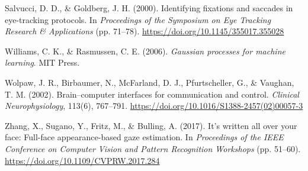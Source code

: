 \documentclass[twocolumn,10pt]{article}
\begin{document}
\begin{description}
    \item Salvucci, D. D., \& Goldberg, J. H. (2000). Identifying fixations and saccades in eye-tracking protocols. In \textit{Proceedings of the Symposium on Eye Tracking Research \& Applications} (pp. 71--78). \url{https://doi.org/10.1145/355017.355028}
    \item Williams, C. K., \& Rasmussen, C. E. (2006). \textit{Gaussian processes for machine learning}. MIT Press.
    \item Wolpaw, J. R., Birbaumer, N., McFarland, D. J., Pfurtscheller, G., \& Vaughan, T. M. (2002). Brain--computer interfaces for communication and control. \textit{Clinical Neurophysiology}, 113(6), 767--791. \url{https://doi.org/10.1016/S1388-2457(02)00057-3}
    \item Zhang, X., Sugano, Y., Fritz, M., \& Bulling, A. (2017). It's written all over your face: Full-face appearance-based gaze estimation. In \textit{Proceedings of the IEEE Conference on Computer Vision and Pattern Recognition Workshops} (pp. 51--60). \url{https://doi.org/10.1109/CVPRW.2017.284}
\end{description}
\end{document}
